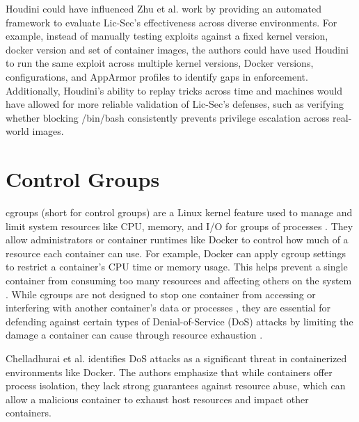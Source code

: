 \documentclass[12pt]{report}
\begin{document}
\begin{doublespace}
Houdini could have influenced Zhu et al. \cite{zhu2021lic} work by providing an automated framework to evaluate Lic-Sec's effectiveness across diverse environments. For example, instead of manually testing exploits against a fixed kernel version, docker version and set of container images, the authors could have used Houdini to run the same exploit across multiple kernel versions, Docker versions, configurations, and AppArmor profiles to identify gaps in enforcement. Additionally, Houdini’s ability to replay tricks across time and machines would have allowed for more reliable validation of Lic-Sec’s defenses, such as verifying whether blocking /bin/bash consistently prevents privilege escalation across real-world images.



\section{Control Groups}

cgroups (short for control groups) are a Linux kernel feature used to manage and limit system resources like CPU, memory, and I/O for groups of processes \cite{chelladhurai2016securing}. They allow administrators or container runtimes like Docker to control how much of a resource each container can use. For example, Docker can apply cgroup settings to restrict a container’s CPU time or memory usage. This helps prevent a single container from consuming too many resources and affecting others on the system \cite{chelladhurai2016securing}. While cgroups are not designed to stop one container from accessing or interfering with another container’s data or processes \cite{chelladhurai2016securing}, they are essential for defending against certain types of Denial-of-Service (DoS) attacks by limiting the damage a container can cause through resource exhaustion \cite{chelladhurai2016securing}.

Chelladhurai et al. \cite{chelladhurai2016securing} identifies DoS attacks as a significant threat in containerized environments like Docker. The authors emphasize that while containers offer process isolation, they lack strong guarantees against resource abuse, which can allow a malicious container to exhaust host resources and impact other containers.


\end{doublespace}
\end{document}
